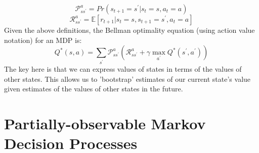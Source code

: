 \documentclass[msc, deptreport, ai, romanprepages]{infthesis}
\begin{document}
\begin{equation}
\mathcal{P}_{s{s^\prime}}^a = Pr(s_{t+1} = {s^\prime} | s_t = s, a_t = a)
\end{equation}
\begin{equation}
\mathcal{R}_{s{s^\prime}}^a = \mathbb{E}[r_{t+1} | s_t = s, s_{t+1} = {s^\prime}, a_t = a]
\end{equation}
Given the above definitions, the Bellman optimality equation (using action value notation) for an MDP is:
\begin{equation}
Q^*(s,a) = \sum_{s^\prime} \mathcal{P}_{s{s^\prime}}^a (\mathcal{R}_{s{s^\prime}}^a + \gamma \max_{a^\prime} Q^*({s^\prime}, {a^\prime}))
\end{equation}
The key here is that we can express values of states in terms of the values of other states. This allows us to 'bootstrap' estimates of our current state's value given estimates of the values of other states in the future. 

\section{Partially-observable Markov Decision Processes}
\end{document}
